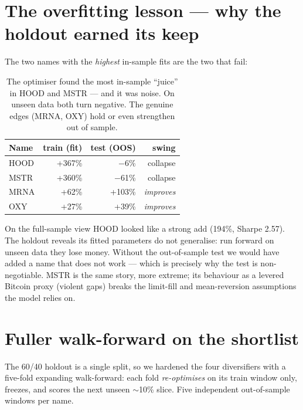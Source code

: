 \documentclass[11pt]{article}
\begin{document}
\section{The overfitting lesson --- why the holdout earned its keep}

The two names with the \emph{highest} in-sample fits are the two that fail:

\begin{table}[H]\centering\small
\renewcommand{\arraystretch}{1.15}
\begin{tabular}{l r r r}
\toprule
\textbf{Name} & \textbf{train (fit)} & \textbf{test (OOS)} & \textbf{swing}\\
\midrule
HOOD & +367\% & $-$6\%  & collapse\\
MSTR & +360\% & $-$61\% & collapse\\
\midrule
MRNA & +62\%  & +103\% & \emph{improves}\\
OXY  & +27\%  & +39\%  & \emph{improves}\\
\bottomrule
\end{tabular}
\caption*{\footnotesize The optimiser found the most in-sample ``juice'' in HOOD and MSTR ---
and it was noise. On unseen data both turn negative. The genuine edges (MRNA, OXY) hold or even
strengthen out of sample.}
\end{table}

On the full-sample view HOOD looked like a strong add (194\%, Sharpe 2.57). The holdout reveals
its fitted parameters do not generalise: run forward on unseen data they lose money. Without the
out-of-sample test we would have added a name that does not work --- which is precisely why the
test is non-negotiable. MSTR is the same story, more extreme; its behaviour as a levered
Bitcoin proxy (violent gaps) breaks the limit-fill and mean-reversion assumptions the model
relies on.

\section{Fuller walk-forward on the shortlist}

The 60/40 holdout is a single split, so we hardened the four diversifiers with a five-fold
expanding walk-forward: each fold \emph{re-optimises} on its train window only, freezes, and
scores the next unseen $\sim$10\% slice. Five independent out-of-sample windows per name.
\end{document}
